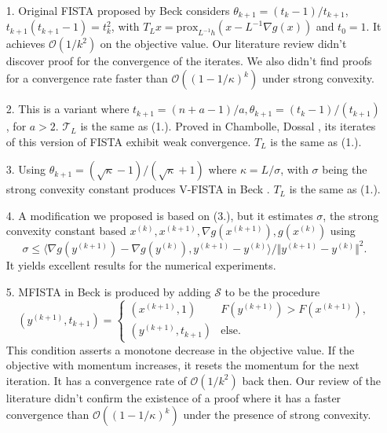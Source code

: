 \documentclass[]{article}
\theoremstyle{definition}
\numberwithin{equation}{subsection}
\begin{document}
        \begin{itemize}
            \item [1.] 
                Original FISTA proposed by Beck \cite{beck_fast_2009-1} considers $\theta_{k + 1} = (t_k - 1)/t_{k + 1}$, $t_{k + 1}(t_{k + 1} - 1) = t_{k}^2$, with $T_L x = \text{prox}_{L^{-1}h}(x  - L^{-1}\nabla g(x))$ and $t_0 = 1$. 
            It achieves $\mathcal O(1/k^2)$ on the objective value. 
            Our literature review didn't discover proof for the convergence of the iterates. We also didn't find proofs for a convergence rate faster than $\mathcal O((1 - 1/\kappa)^k)$ under strong convexity. 
            \item [2.] 
                This is a variant where $t_{k + 1} = (n + a - 1)/a, \theta_{k + 1} = (t_{k} - 1)/(t_{k + 1})$, for $a > 2$. $\mathcal T_L$ is the same as (1.). 
            Proved in Chambolle, Dossal \cite{chambolle_convergence_2015}, its iterates of this version of FISTA exhibit weak convergence. $T_L$ is the same as (1.). 
            \item [3.] 
                Using $\theta_{k + 1} = (\sqrt{\kappa} - 1)/(\sqrt{\kappa} + 1)$ where $\kappa = L/\sigma$, with $\sigma$ being the strong convexity constant produces V-FISTA in Beck \cite[10.7.7]{beck_first-order_nodate}\cite[3.3]{noel_nesterovs_nodate}. $T_L$ is the same as (1.). 
            \item [4.] 
                A modification we proposed is based on (3.), but it estimates $\sigma$, the strong convexity constant based $x^{(k)}, x^{(k + 1)}, \nabla g(x^{(k + 1)}), g(x^{(k)})$ using 
                \[
                    \sigma \le \langle \nabla g(y^{(k + 1)}) - \nabla g(y^{(k)}), y^{(k + 1)} - y^{(k)}\rangle/ 
                    \Vert y^{(k + 1)} - y^{(k)}\Vert^2. 
                \]
            It yields excellent results for the numerical experiments. 
            \item [5.] 
                MFISTA in Beck\cite{beck_fast_2009} is produced by adding $\mathcal S$ to be the procedure
                \[
                    (y^{(k + 1)}, t_{k + 1}) = \begin{cases}
                        (x^{(k + 1)}, 1) & F(y^{(k + 1)}) > F(x^{(k + 1)}),
                        \\
                        (y^{(k + 1)}, t_{k + 1}) & \text{else}. 
                    \end{cases}
                \]
                This condition asserts a monotone decrease in the objective value. If the objective with momentum increases, it resets the momentum for the next iteration.  It has a convergence rate of $\mathcal O(1/k^2)$ back then. Our review of the literature didn't confirm the existence of a proof where it has a faster convergence than $\mathcal O((1 - 1/\kappa)^k)$ under the presence of strong convexity. 
        \end{itemize}
\end{document}

